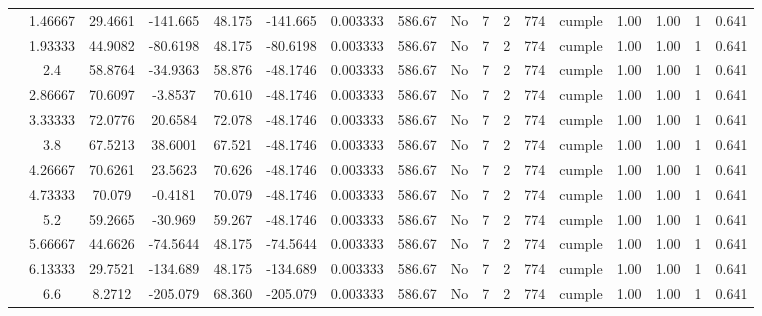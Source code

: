 \begin{table}[H]
{\begin{tabular}{|c|c|c|c|c|c|c|c|c|c|c|c|c|c|c|c|c|}
\cline{2-17}    & 1.46667 & 29.4661 & -141.665 & 48.175 & -141.665 & 0.003333 & 586.67 & No  & 7   & 2   & 774 & \cellcolor[rgb]{ .776,  .937,  .808}cumple & 1.00 & 1.00 & 1   & 0.641 \bigstrut\\
\cline{2-17}    & 1.93333 & 44.9082 & -80.6198 & 48.175 & -80.6198 & 0.003333 & 586.67 & No  & 7   & 2   & 774 & \cellcolor[rgb]{ .776,  .937,  .808}cumple & 1.00 & 1.00 & 1   & 0.641 \bigstrut\\
\cline{2-17}    & 2.4 & 58.8764 & -34.9363 & 58.876 & -48.1746 & 0.003333 & 586.67 & No  & 7   & 2   & 774 & \cellcolor[rgb]{ .776,  .937,  .808}cumple & 1.00 & 1.00 & 1   & 0.641 \bigstrut\\
\cline{2-17}    & 2.86667 & 70.6097 & -3.8537 & 70.610 & -48.1746 & 0.003333 & 586.67 & No  & 7   & 2   & 774 & \cellcolor[rgb]{ .776,  .937,  .808}cumple & 1.00 & 1.00 & 1   & 0.641 \bigstrut\\
\cline{2-17}    & 3.33333 & 72.0776 & 20.6584 & 72.078 & -48.1746 & 0.003333 & 586.67 & No  & 7   & 2   & 774 & \cellcolor[rgb]{ .776,  .937,  .808}cumple & 1.00 & 1.00 & 1   & 0.641 \bigstrut\\
\cline{2-17}    & 3.8 & 67.5213 & 38.6001 & 67.521 & -48.1746 & 0.003333 & 586.67 & No  & 7   & 2   & 774 & \cellcolor[rgb]{ .776,  .937,  .808}cumple & 1.00 & 1.00 & 1   & 0.641 \bigstrut\\
\cline{2-17}    & 4.26667 & 70.6261 & 23.5623 & 70.626 & -48.1746 & 0.003333 & 586.67 & No  & 7   & 2   & 774 & \cellcolor[rgb]{ .776,  .937,  .808}cumple & 1.00 & 1.00 & 1   & 0.641 \bigstrut\\
\cline{2-17}    & 4.73333 & 70.079 & -0.4181 & 70.079 & -48.1746 & 0.003333 & 586.67 & No  & 7   & 2   & 774 & \cellcolor[rgb]{ .776,  .937,  .808}cumple & 1.00 & 1.00 & 1   & 0.641 \bigstrut\\
\cline{2-17}    & 5.2 & 59.2665 & -30.969 & 59.267 & -48.1746 & 0.003333 & 586.67 & No  & 7   & 2   & 774 & \cellcolor[rgb]{ .776,  .937,  .808}cumple & 1.00 & 1.00 & 1   & 0.641 \bigstrut\\
\cline{2-17}    & 5.66667 & 44.6626 & -74.5644 & 48.175 & -74.5644 & 0.003333 & 586.67 & No  & 7   & 2   & 774 & \cellcolor[rgb]{ .776,  .937,  .808}cumple & 1.00 & 1.00 & 1   & 0.641 \bigstrut\\
\cline{2-17}    & 6.13333 & 29.7521 & -134.689 & 48.175 & -134.689 & 0.003333 & 586.67 & No  & 7   & 2   & 774 & \cellcolor[rgb]{ .776,  .937,  .808}cumple & 1.00 & 1.00 & 1   & 0.641 \bigstrut\\
\cline{2-17}    & \cellcolor[rgb]{ .851,  .882,  .949}6.6 & 8.2712 & -205.079 & 68.360 & -205.079 & 0.003333 & 586.67 & No  & 7   & 2   & 774 & \cellcolor[rgb]{ .776,  .937,  .808}cumple & 1.00 & 1.00 & 1   & 0.641 \bigstrut\\

\end{tabular}}
\end{table}
